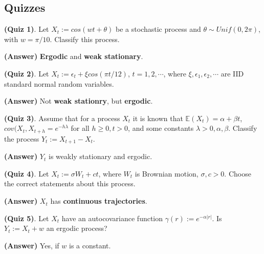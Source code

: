 \documentclass[12pt]{article}
\theoremstyle{nonumberbreak}
\begin{document}
\subsection*{Quizzes}


\textbf{(Quiz 1)}. Let $X_t := cos(wt + \theta)$ be a stochastic process and $\theta \sim Unif(0,2\pi)$, with $w=\pi/10$. Classify this process.

\textbf{(Answer)} \textbf{Ergodic} and \textbf{weak stationary}. 


\textbf{(Quiz 2)}. Let $X_t := \epsilon_t + \xi cos(\pi t/12)$, $t=1,2,\cdots$, where $\xi, \epsilon_1, \epsilon_2, \cdots$ are IID standard normal random variables.

\textbf{(Answer)} Not \textbf{weak stationry}, but \textbf{ergodic}.


\textbf{(Quiz 3)}. Assume that for a process $X_t$ it is known that $\mathbb{E} (X_t) = \alpha + \beta t$, $cov(X_t, X_{t+h} = e^{-h \lambda}$ for all $h \ge 0, t >0$, and some constants $\lambda >0, \alpha, \beta$. Classify the process $Y_t := X_{t+1} - X_t$. 

\textbf{(Answer)} $Y_t$ is weakly stationary and ergodic.


\textbf{(Quiz 4)}. Let $X_t := \sigma W_t + ct$, where $W_t$ is Brownian motion, $\sigma, c >0$. Choose the correct statements about this process. 

\textbf{(Answer)} $X_t$ has \textbf{continuous trajectories}. 


\textbf{(Quiz 5)}. Let $X_t$ have an autocovariance function $\gamma(r) := e^{-\alpha |r|}$. Is $Y_t := X_t + w$ an ergodic process?


\textbf{(Answer)} Yes, if $w$ is a constant. 
\end{document}
